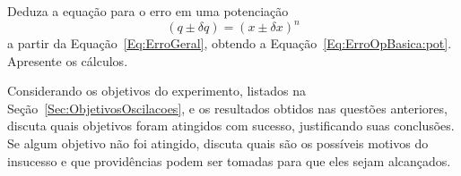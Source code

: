 \begin{question}[type={exam}]{1}
Deduza a equação para o erro em uma potenciação
\begin{equation}
    (q \pm \delta q) = (x \pm \delta x)^n
\end{equation}
%
a partir da Equação~\eqref{Eq:ErroGeral}, obtendo a Equação~\eqref{Eq:ErroOpBasica:pot}. Apresente os cálculos.
\end{question}

\begin{question}[type={exam}]{2}
Considerando os objetivos do experimento, listados na Seção~\ref{Sec:ObjetivosOscilacoes}, e os resultados obtidos nas questões anteriores, discuta quais objetivos foram atingidos com sucesso, justificando suas conclusões. Se algum objetivo não foi atingido, discuta quais são os possíveis motivos do insucesso e que providências podem ser tomadas para que eles sejam alcançados.
\end{question}

\vfill
\pagebreak
